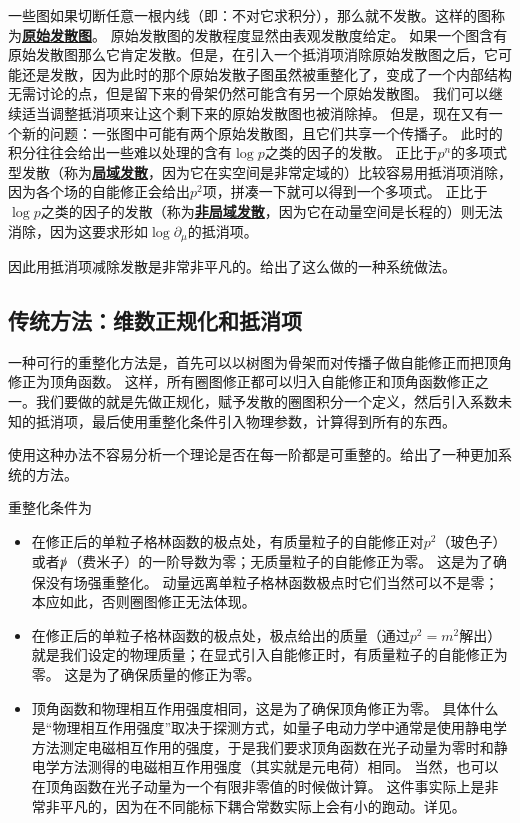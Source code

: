 \documentclass[hyperref, UTF8, a4paper]{ctexart}
\renewcommand{\autoref}{\prettyref}
\newcommand{\concept}[1]{\underline{\textbf{#1}}}
\begin{document}
一些图如果切断任意一根内线（即：不对它求积分），那么就不发散。这样的图称为\concept{原始发散图}。
原始发散图的发散程度显然由表观发散度给定。
如果一个图含有原始发散图那么它肯定发散。但是，在引入一个抵消项消除原始发散图之后，它可能还是发散，因为此时的那个原始发散子图虽然被重整化了，变成了一个内部结构无需讨论的点，但是留下来的骨架仍然可能含有另一个原始发散图。
我们可以继续适当调整抵消项来让这个剩下来的原始发散图也被消除掉。
但是，现在又有一个新的问题：一张图中可能有两个原始发散图，且它们共享一个传播子。
此时的积分往往会给出一些难以处理的含有$\log p$之类的因子的发散。
正比于$p^n$的多项式型发散（称为\concept{局域发散}，因为它在实空间是非常定域的）比较容易用抵消项消除，因为各个场的自能修正会给出$p^2$项，拼凑一下就可以得到一个多项式。
正比于$\log p$之类的因子的发散（称为\concept{非局域发散}，因为它在动量空间是长程的）则无法消除，因为这要求形如$\log \partial_\mu$的抵消项。

因此用抵消项减除发散是非常非平凡的。\autoref{sec:bphz}给出了这么做的一种系统做法。

\subsection{传统方法：维数正规化和抵消项}

一种可行的重整化方法是，首先可以以树图为骨架而对传播子做自能修正而把顶角修正为顶角函数。
这样，所有圈图修正都可以归入自能修正和顶角函数修正之一。我们要做的就是先做正规化，赋予发散的圈图积分一个定义，然后引入系数未知的抵消项，最后使用重整化条件引入物理参数，计算得到所有的东西。

使用这种办法不容易分析一个理论是否在每一阶都是可重整的。\autoref{sec:bphz}给出了一种更加系统的方法。

重整化条件为
\begin{itemize}
    \item 在修正后的单粒子格林函数的极点处，有质量粒子的自能修正对$p^2$（玻色子）或者$\slashed{p}$（费米子）的一阶导数为零；无质量粒子的自能修正为零。
    这是为了确保没有场强重整化。
    动量远离单粒子格林函数极点时它们当然可以不是零；本应如此，否则圈图修正无法体现。
    \item 在修正后的单粒子格林函数的极点处，极点给出的质量（通过$p^2=m^2$解出）就是我们设定的物理质量；在显式引入自能修正时，有质量粒子的自能修正为零。
    这是为了确保质量的修正为零。
    \item 顶角函数和物理相互作用强度相同，这是为了确保顶角修正为零。
    具体什么是“物理相互作用强度”取决于探测方式，如量子电动力学中通常是使用静电学方法测定电磁相互作用的强度，于是我们要求顶角函数在光子动量为零时和静电学方法测得的电磁相互作用强度（其实就是元电荷）相同。
    当然，也可以在顶角函数在光子动量为一个有限非零值的时候做计算。
    这件事实际上是非常非平凡的，因为在不同能标下耦合常数实际上会有小的跑动。详见\autoref{sec:rg}。
\end{itemize}
\end{document}
